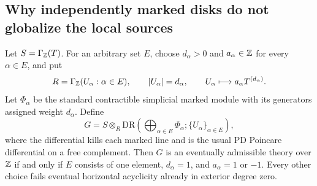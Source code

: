 \subsection{Why independently marked disks do not globalize the local sources}

\begin{proposition}
\label{sa08:D022}
Let $S=\Gamma_{\mathbb Z}(T)$. For an arbitrary set $E$, choose
$d_\alpha>0$ and $a_\alpha\in\mathbb Z$ for every $\alpha\in E$, and put
\[
 R=\Gamma_{\mathbb Z}(U_\alpha:\alpha\in E),\qquad
 |U_\alpha|=d_\alpha,\qquad
 U_\alpha\longmapsto a_\alpha T^{(d_\alpha)}.
\]
Let $\Phi_\alpha$ be the standard contractible simplicial marked
module with its generators assigned weight $d_\alpha$. Define
\[
 G=S\otimes_R
 \mathrm{DR}\left(\bigoplus_{\alpha\in E}\Phi_\alpha;
                         \{U_\alpha\}_{\alpha\in E}\right),
\]
where the differential kills each marked line and is the usual
PD Poincare differential on a free complement. Then $G$ is an
eventually admissible theory over $\mathbb Z$ if and only if $E$ consists
of one element, $d_\alpha=1$, and $a_\alpha=1$ or $-1$.
Every other choice fails eventual horizontal acyclicity already
in exterior degree zero.
\end{proposition}
